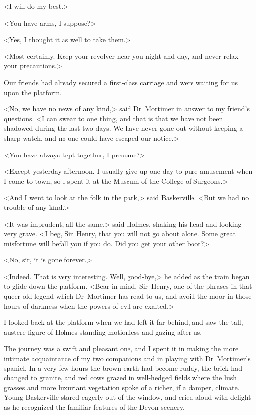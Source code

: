 <I will do my best.>

<You have arms, I suppose?>

<Yes, I thought it as well to take them.>

<Most certainly. Keep your revolver near you night and day, and never relax your precautions.>

Our friends had already secured a first-class carriage and were waiting for us upon the platform.

<No, we have no news of any kind,> said Dr~Mortimer in answer to my friend's questions. <I can swear to one thing, and that is that we have not been shadowed during the last two days. We have never gone out without keeping a sharp watch, and no one could have escaped our notice.>

<You have always kept together, I presume?>

<Except yesterday afternoon. I usually give up one day to pure amusement when I come to town, so I spent it at the Museum of the College of Surgeons.>

<And I went to look at the folk in the park,> said Baskerville. <But we had no trouble of any kind.>

<It was imprudent, all the same,> said Holmes, shaking his head and looking very grave. <I beg, Sir~Henry, that you will not go about alone. Some great misfortune will befall you if you do. Did you get your other boot?>

<No, sir, it is gone forever.>

<Indeed. That is very interesting. Well, good-bye,> he added as the train began to glide down the platform. <Bear in mind, Sir~Henry, one of the phrases in that queer old legend which Dr~Mortimer has read to us, and avoid the moor in those hours of darkness when the powers of evil are exalted.>

I looked back at the platform when we had left it far behind, and saw the tall, austere figure of Holmes standing motionless and gazing after us.

The journey was a swift and pleasant one, and I spent it in making the more intimate acquaintance of my two companions and in playing with Dr~Mortimer's spaniel. In a very few hours the brown earth had become ruddy, the brick had changed to granite, and red cows grazed in well-hedged fields where the lush grasses and more luxuriant vegetation spoke of a richer, if a damper, climate. Young Baskerville stared eagerly out of the window, and cried aloud with delight as he recognized the familiar features of the Devon scenery.

